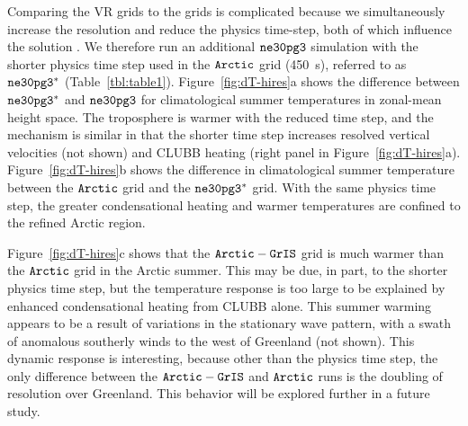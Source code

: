 \documentclass[draft]{agujournal2019}
\begin{document}
Comparing the VR grids to the {\color{blue}{lat-lon and quasi-uniform}} grids is complicated because we simultaneously increase the resolution and reduce the physics time-step, both of which influence the solution \cite{W2008TELLUS}. We therefore run an additional $\tt ne30pg3$ simulation with the shorter physics time step used in the $\tt Arctic$ grid (450~s), referred to as $\tt ne30pg3^{*}$ (Table~\ref{tbl:table1}). Figure~\ref{fig:dT-hires}a shows the difference between $\tt ne30pg3^{*}$ and $\tt ne30pg3$ for climatological summer temperatures in zonal-mean height space. The troposphere is warmer with the reduced time step, and the mechanism is similar in that the shorter time step increases resolved vertical velocities (not shown) and CLUBB heating (right panel in Figure~\ref{fig:dT-hires}a). Figure~\ref{fig:dT-hires}b shows the difference in climatological summer temperature between the $\tt Arctic$ grid and the $\tt ne30pg3^{*}$ grid.  With the same physics time step, the greater condensational heating and warmer temperatures are confined to the refined Arctic region.

{}

Figure~\ref{fig:dT-hires}c shows that the $\tt Arctic-GrIS$ grid is much warmer than the $\tt Arctic$ grid in the Arctic summer. This may be due, in part, to the shorter physics time step, but the temperature response is too large to be explained by enhanced condensational heating from CLUBB alone. This summer warming appears to be a result of variations in the stationary wave pattern, with a swath of anomalous southerly winds to the west of Greenland (not shown). This dynamic response is interesting, because other than the physics time step, the only difference between the $\tt Arctic-GrIS$ and $\tt Arctic$ runs is the doubling of resolution over Greenland. This behavior will be explored further in a future study.
\end{document}
